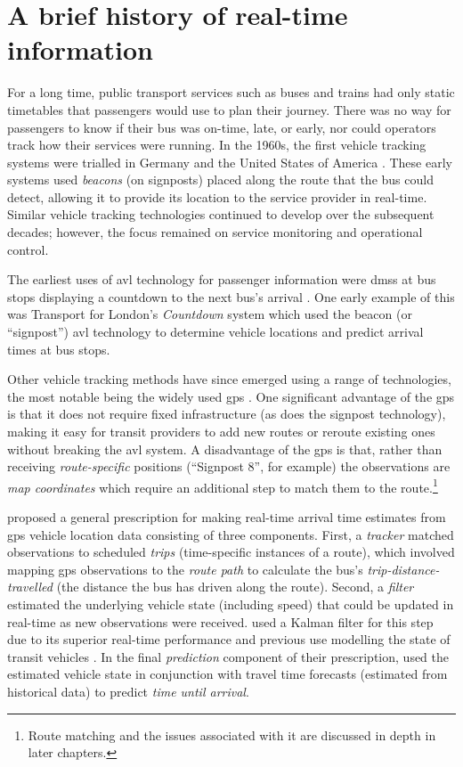 \section{A brief history of real-time information}
\label{sec:literature}

For a long time, public transport services such as buses and trains had only static timetables that passengers would use to plan their journey. There was no way for passengers to know if their bus was on-time, late, or early, nor could operators track how their services were running. In the 1960s, the first vehicle tracking systems were trialled in Germany and the United States of America \citep{TCRP_1997}. These early systems used \emph{beacons} (on signposts) placed along the route that the bus could detect, allowing it to provide its location to the service provider in real-time. Similar vehicle tracking technologies continued to develop over the subsequent decades; however, the focus remained on service monitoring and operational control.


The earliest uses of \gls{avl} technology for passenger information were \glspl{dms} at bus stops displaying a countdown to the next bus's arrival \citep{TCRP_2003}. One early example of this was Transport for London's \emph{Countdown} system \citep{Balogh_1993} which used the beacon (or ``signpost'') \gls{avl} technology to determine vehicle locations and predict arrival times at bus stops.


Other vehicle tracking methods have since emerged using a range of technologies, the most notable being the widely used \gls{gps} \citep{Zhao_1997}. One significant advantage of the \gls{gps} is that it does not require fixed infrastructure (as does the signpost technology), making it easy for transit providers to add new routes or reroute existing ones without breaking the \gls{avl} system. A disadvantage of the \gls{gps} is that, rather than receiving \emph{route-specific} positions (``Signpost 8'', for example) the observations are \emph{map coordinates} which require an additional step to match them to the route.\footnote{Route matching and the issues associated with it are discussed in depth in later chapters.}


\citet{Cathey_2003} proposed a general prescription for making real-time arrival time estimates from \gls{gps} vehicle location data consisting of three components. First, a \emph{tracker} matched observations to scheduled \emph{trips} (time-specific instances of a route), which involved mapping \gls{gps} observations to the \emph{route path} to calculate the bus's \emph{trip-distance-travelled} (the distance the bus has driven along the route). Second, a \emph{filter} estimated the underlying vehicle state (including speed) that could be updated in real-time as new observations were received.  used a Kalman filter for this step due to its superior real-time performance and previous use modelling the state of transit vehicles \citep{Wall_1999, Dailey_2001}. In the final \emph{prediction} component of their prescription, \citeauthor{Cathey_2003} used the estimated vehicle state in conjunction with travel time forecasts (estimated from historical data) to predict \emph{time until arrival}.



